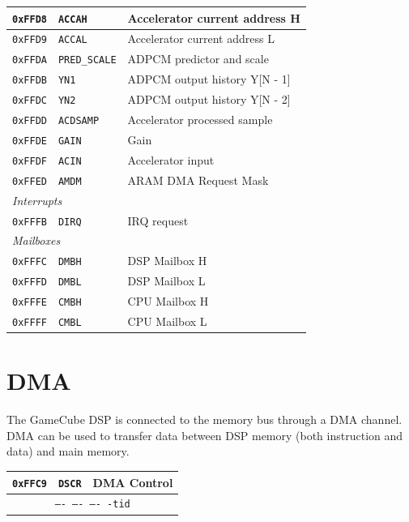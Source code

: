 \documentclass[oneside,english,a4paper,10pt,oneside,openany,final]{memoir}
\newcommand{\Address}[1]{\texttt{#1}}
\newcommand{\Register}[1]{\texttt{#1}}
\newcommand{\RegisterBitOverview}[4]{
  \begin{table}[H]
  \centering
  \begin{tabular}{|lcr|}
  \hline
  \Address{#1} & \Register{#2} & {#3} \\ \hline
  \multicolumn{3}{|c|}{\texttt{#4}}   \\ \hline
  \end{tabular}
  \end{table}
}
\begin{document}
\begin{table}[htb]
\begin{tabular}{|l|l|l|}
\Address{0xFFD8} & \Register{ACCAH}   & Accelerator current address H \\ \hline
\Address{0xFFD9} & \Register{ACCAL}   & Accelerator current address L \\ \hline
\Address{0xFFDA} & \Register{PRED\_SCALE} & ADPCM predictor and scale \\ \hline
\Address{0xFFDB} & \Register{YN1}     & ADPCM output history Y[N - 1] \\ \hline
\Address{0xFFDC} & \Register{YN2}     & ADPCM output history Y[N - 2] \\ \hline
\Address{0xFFDD} & \Register{ACDSAMP} & Accelerator processed sample  \\ \hline
\Address{0xFFDE} & \Register{GAIN}    & Gain                          \\ \hline
\Address{0xFFDF} & \Register{ACIN}    & Accelerator input             \\ \hline
\Address{0xFFED} & \Register{AMDM}    & ARAM DMA Request Mask         \\ \hline
\multicolumn{3}{|l|}{\textit{Interrupts}}                             \\ \hline
\Address{0xFFFB} & \Register{DIRQ}    & IRQ request                   \\ \hline
\multicolumn{3}{|l|}{\textit{Mailboxes}}                              \\ \hline
\Address{0xFFFC} & \Register{DMBH}    & DSP Mailbox H                 \\ \hline
\Address{0xFFFD} & \Register{DMBL}    & DSP Mailbox L                 \\ \hline
\Address{0xFFFE} & \Register{CMBH}    & CPU Mailbox H                 \\ \hline
\Address{0xFFFF} & \Register{CMBL}    & CPU Mailbox L                 \\ \hline
\end{tabular}
\end{table}

\pagebreak{}

\section{DMA}

The GameCube DSP is connected to the memory bus through a DMA channel. DMA can be used to transfer data between DSP memory (both instruction and data) and main memory.

\RegisterBitOverview{0xFFC9}{DSCR}{DMA Control}{---- ---- ---- -tid}
\end{document}
